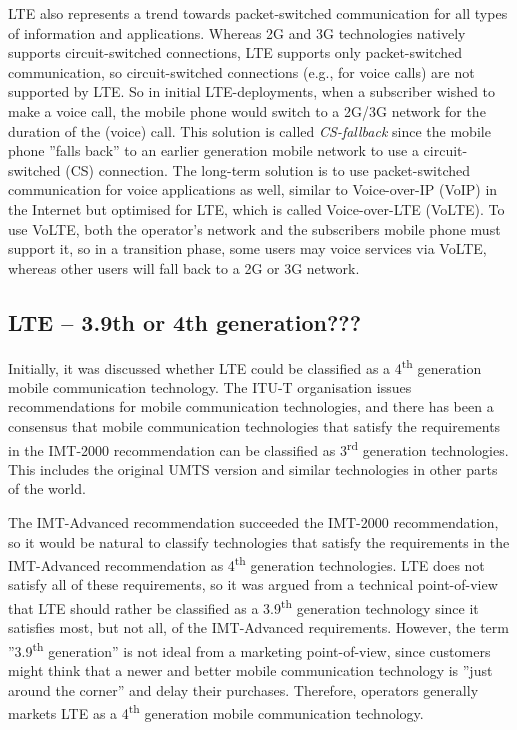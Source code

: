 LTE also represents a trend towards packet-switched communication for all types of information and applications. Whereas 2G and 3G technologies natively supports circuit-switched connections, LTE supports only packet-switched communication, so circuit-switched connections (e.g., for voice calls) are not supported by LTE. So in initial LTE-deployments, when a subscriber wished to make a voice call, the mobile phone would switch to a 2G/3G network for the duration of the (voice) call. This solution is called \emph{CS-fallback} since the mobile phone ''falls back'' to an earlier generation mobile network to use a circuit-switched (CS) connection. The long-term solution is to use packet-switched communication for voice applications as well, similar to Voice-over-IP (VoIP) in the Internet but optimised for LTE, which is called Voice-over-LTE (VoLTE). To use VoLTE, both the operator's network and the subscribers mobile phone must support it, so in a transition phase, some users may voice services via VoLTE, whereas other users will fall back to a 2G or 3G network.

\subsection{LTE -- 3.9th or 4th generation???}
Initially, it was discussed whether LTE could be classified as a 4\textsuperscript{th} generation mobile communication technology. The ITU-T organisation issues recommendations for mobile communication technologies, and there has been a consensus that mobile communication technologies that satisfy the requirements in the IMT-2000 recommendation can be classified as 3\textsuperscript{rd} generation technologies. This includes the original UMTS version and similar technologies in other parts of the world.

The IMT-Advanced recommendation succeeded the IMT-2000 recommendation, so it would be natural to classify technologies that satisfy the requirements in the IMT-Advanced recommendation as 4\textsuperscript{th} generation technologies. LTE does not satisfy all of these requirements, so it was argued from a technical point-of-view that LTE should rather be classified as a 3.9\textsuperscript{th} generation technology since it satisfies most, but not all, of the IMT-Advanced requirements. However, the term ''3.9\textsuperscript{th} generation'' is not ideal from a marketing point-of-view, since customers might think that a newer and better mobile communication technology is ''just around the corner'' and delay their purchases. Therefore, operators generally markets LTE as a 4\textsuperscript{th} generation mobile communication technology.

